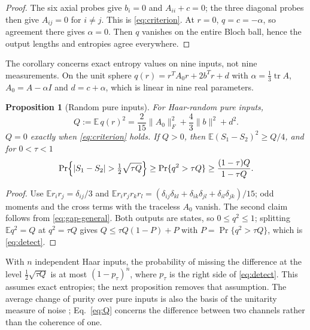 \documentclass[12pt,a4paper]{article}
\newtheorem{proposition}[theorem]{Proposition}
\begin{document}
\begin{proof}
The six axial probes give $b_i=0$ and $A_{ii}+c=0$; the three diagonal probes then give $A_{ij}=0$ for $i\ne j$. This is \eqref{eq:criterion}. At $r=0$, $q=c=-\alpha$, so agreement there gives $\alpha=0$. Then $q$ vanishes on the entire Bloch ball, hence the output lengths and entropies agree everywhere.
\end{proof}

The corollary concerns exact entropy values on nine inputs, not nine measurements. On the unit sphere $q(r)=r^TA_0r+2b^Tr+d$ with $\alpha=\tfrac13\operatorname{tr}A$, $A_0=A-\alpha I$ and $d=c+\alpha$, which is linear in nine real parameters.

\begin{proposition}[Random pure inputs]
\label{prop:haar}
For Haar-random pure inputs,
\begin{equation}
Q:=\mathbb E\,q(r)^2=\frac{2}{15}\|A_0\|_F^2+\frac43\|b\|^2+d^2 .
\label{eq:Q}
\end{equation}
$Q=0$ exactly when \eqref{eq:criterion} holds. If $Q>0$, then $\mathbb E(S_1-S_2)^2\ge Q/4$, and for $0<\tau<1$
\begin{equation}
\Pr\Bigl\{|S_1-S_2|>\tfrac12\sqrt{\tau Q}\Bigr\}
\ge\Pr\{q^2>\tau Q\}
\ge\frac{(1-\tau)Q}{1-\tau Q}.
\label{eq:detect}
\end{equation}
\end{proposition}

\begin{proof}
Use $\mathbb E r_ir_j=\delta_{ij}/3$ and $\mathbb E r_ir_jr_kr_l=(\delta_{ij}\delta_{kl}+\delta_{ik}\delta_{jl}+\delta_{il}\delta_{jk})/15$; odd moments and the cross terms with the traceless $A_0$ vanish. The second claim follows from \eqref{eq:gap-general}. Both outputs are states, so $0\le q^2\le1$; splitting $\mathbb E q^2=Q$ at $q^2=\tau Q$ gives $Q\le\tau Q(1-P)+P$ with $P=\Pr\{q^2>\tau Q\}$, which is \eqref{eq:detect}.
\end{proof}

With $n$ independent Haar inputs, the probability of missing the difference at the level $\tfrac12\sqrt{\tau Q}$ is at most $(1-p_\tau)^n$, where $p_\tau$ is the right side of \eqref{eq:detect}. This assumes exact entropies; the next proposition removes that assumption. The average change of purity over pure inputs is also the basis of the unitarity measure of noise \cite{Wallman2015}; Eq.~\eqref{eq:Q} concerns the difference between two channels rather than the coherence of one.
\end{document}
